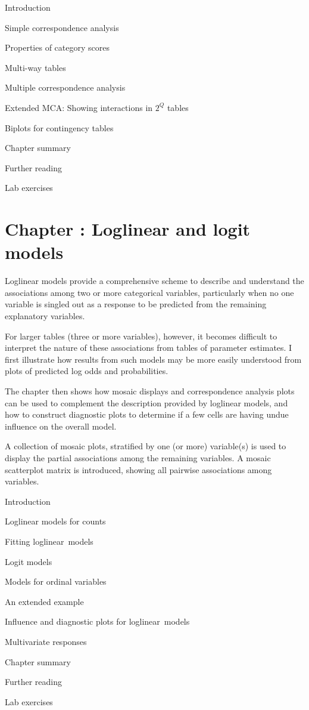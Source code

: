 \documentclass{article}
\newcommand{\Chapter}[1]{\section{Chapter \thesection: #1}}
\newcommand{\Section}[1]{\item #1}
\newcommand{\loglin}{loglinear}
\begin{document}
\begin{enumerate*}
  \Section{Introduction}
  \Section{Simple correspondence analysis}\label{sec:ca-simple}
  \Section{Properties of category scores}
  \Section{Multi-way tables}\label{sec:ca-multiway}
  \Section{Multiple correspondence analysis}\label{sec:mca}
  \Section{Extended MCA: Showing interactions in $2^Q$ tables}\label{sec:ca-mcainter}
  \Section{Biplots for contingency tables}\label{sec:biplot}
  \Section{Chapter summary}\label{sec:ca-summary}
	\Section{Further reading}\label{sec:ca-reading}
  \Section{Lab exercises}\label{sec:ca-lab}
\end{enumerate*}

\Chapter{Loglinear  and logit models}\label{ch:loglin}

Loglinear models provide a comprehensive scheme to describe and
understand the associations among two or more categorical variables,
particularly when no one variable is singled out as a response
to be predicted from the remaining explanatory variables.

For larger tables (three or more variables), however, it becomes
difficult to interpret the nature of these associations from tables
of parameter estimates.
I first illustrate how results from such models may be more
easily understood from plots of predicted log odds and probabilities.

The chapter then shows how mosaic displays and
correspondence analysis plots can be used to complement the description
provided by loglinear models, and how to construct diagnostic
plots to determine if a few cells are having undue influence on
the overall model.

A collection of mosaic plots, stratified by one (or more) variable(s)
is used to display the partial associations among the remaining
variables.  A mosaic scatterplot matrix is introduced,
showing all pairwise associations among variables.

\begin{enumerate*}
  \Section{Introduction}
  \Section{Loglinear models for counts}\label{sec:loglin-counts}
  \Section{Fitting \loglin\ models} \label{sec:loglin-fitting}
  \Section{Logit models}\label{sec:loglin-logit}
  \Section{Models for ordinal variables}\label{sec:loglin-ordinal}
  \Section{An extended example}\label{sec:loglin-vietnam}
  \Section{Influence and diagnostic plots for \loglin\ models}\label{sec:loglin-infl}
  \Section{Multivariate responses}\label{sec:loglin-multiv}
  \Section{Chapter summary}\label{sec:loglin-summary}
	\Section{Further reading}\label{sec:loglin-reading}
  \Section{Lab exercises}\label{sec:loglin-lab}
\end{enumerate*}
\end{document}
